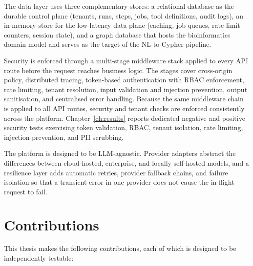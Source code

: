 \documentclass[a4paper,noexaminfo]{sapthesis}
\begin{document}
The data layer uses three complementary stores: a relational database as
the durable control plane (tenants, runs, steps, jobs, tool definitions,
audit logs), an in-memory store for the low-latency data plane (caching,
job queues, rate-limit counters, session state), and a graph database that
hosts the bioinformatics domain model and serves as the target of the
NL-to-Cypher pipeline.

Security is enforced through a multi-stage middleware stack applied to
every API route before the request reaches business logic.  The stages
cover cross-origin policy, distributed tracing, token-based authentication
with RBAC enforcement, rate limiting, tenant resolution, input validation
and injection prevention, output sanitisation, and centralised error
handling.  Because the same middleware chain is applied to all API
routes, security and tenant checks are enforced consistently across the
platform.  Chapter~\ref{ch:results} reports dedicated negative and
positive security tests exercising token validation, RBAC, tenant
isolation, rate limiting, injection prevention, and PII scrubbing.

The platform is designed to be LLM-agnostic.  Provider adapters abstract
the differences between cloud-hosted, enterprise, and locally self-hosted
models, and a resilience layer adds automatic retries, provider fallback
chains, and failure isolation so that a transient error in one provider
does not cause the in-flight request to fail.

\section{Contributions}
\label{sec:contributions}

This thesis makes the following contributions, each of which is designed to
be independently testable:
\end{document}
